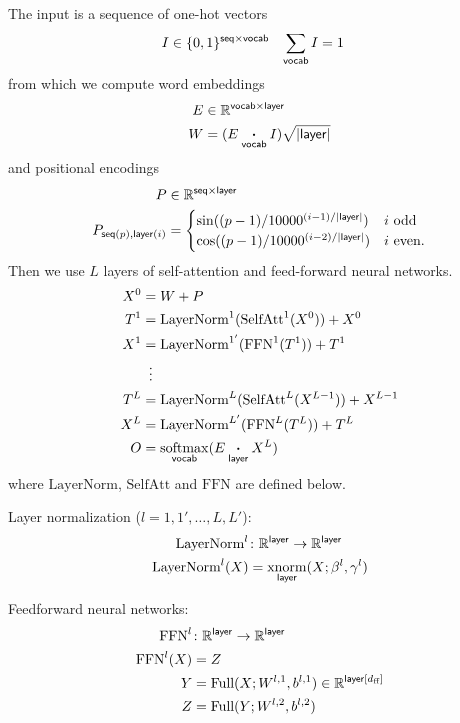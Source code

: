 \documentclass{article}
\newcommand{\reals}{\mathbb{R}}
\newcommand{\dff}{d_{\text{ff}}}
\begin{document}
The input is a sequence of one-hot vectors
\begin{align*}
  I &\in \{0, 1\}^{\name{seq} \times \name{vocab}} & \nsum{vocab} I &= 1
\end{align*}
from which we compute word embeddings
\begin{align*}
  E &\in \reals^{\name{vocab} \times \name{layer}} \\
  W &= (E \ndot{vocab} I)\sqrt{|\name{layer}|}
\end{align*}
and positional encodings
\begin{align*}
  P &\in \reals^{\name{seq} \times \name{layer}} \\
  P_{\nidx{seq}{p}, \nidx{layer}{i}} &= \begin{cases}
    \sin((p-1) / 10000^{(i-1) / |\name{layer}|}) & \text{$i$ odd} \\ 
    \cos((p-1) / 10000^{(i-2) / |\name{layer}|}) & \text{$i$ even.}
  \end{cases}
\end{align*}
Then we use $L$ layers of self-attention and feed-forward neural networks.
\begin{align*} 
X^0 &= W+P \\
T^1 &= \text{LayerNorm}^1(\text{SelfAtt}^1(X^0)) + X^0\\
X^1 &= \text{LayerNorm}^{1'}(\text{FFN}^1(T^1)) + T^1\\
&\vdotswithin{=} \\
T^{L} &= \text{LayerNorm}^L(\text{SelfAtt}^L(X^{L-1})) + X^{L-1}\\
X^{L} &= \text{LayerNorm}^{L'}(\text{FFN}^L(T^L)) + T^L\\
O &= \nfun{vocab}{softmax}(E \ndot{layer} X^L)
\end{align*}
where $\text{LayerNorm}$, $\text{SelfAtt}$ and $\text{FFN}$ are defined below.

Layer normalization ($l = 1, 1', \ldots, L, L'$):
\begin{align*}
  \text{LayerNorm}^l &\colon \mathbb{R}^{\name{layer}} \rightarrow \mathbb{R}^{\name{layer}} \\
  \text{LayerNorm}^l(X) &= \nfun{layer}{xnorm}(X; \beta^l, \gamma^l) 
\end{align*}

Feedforward neural networks:
\begin{align*}
  \text{FFN}^l &\colon \mathbb{R}^{\name{layer}} \rightarrow \mathbb{R}^{\name{layer}} \\
  \text{FFN}^l(X) &= Z \\
  Y &= \text{Full}(X; W^{l,1}, b^{l,1}) \in \mathbb{R}^{\nset{layer}{\dff}}\\
  Z &= \text{Full}(Y; W^{l,2}, b^{l,2})
\end{align*}
\end{document}
